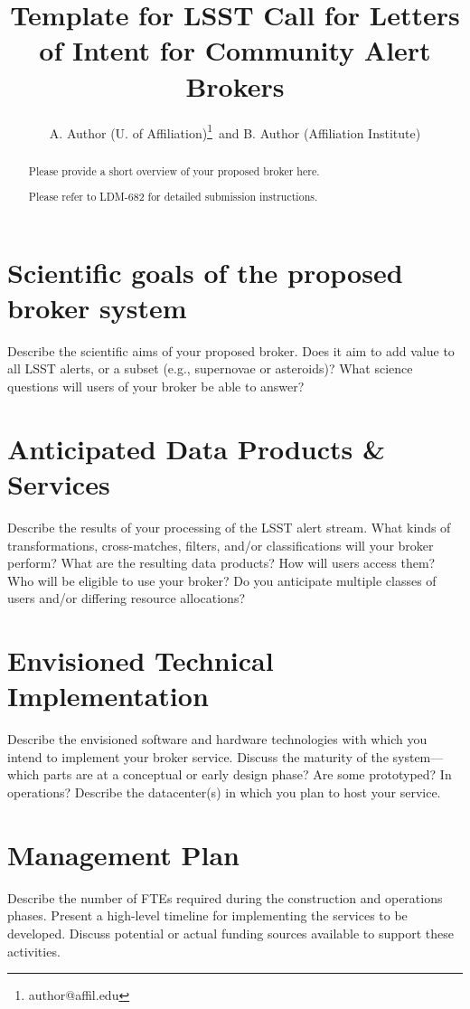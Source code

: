 \documentclass[11pt, letterpaper]{article}
\title{Template for LSST Call for Letters of Intent for Community Alert Brokers}
\author{A. Author (U. of Affiliation)\footnote{author@affil.edu}\ and B. Author (Affiliation Institute)}
\date{}
\begin{document}
\maketitle

\begin{abstract}
Please provide a short overview of your proposed broker here.

Please refer to LDM-682 for detailed submission instructions.
\end{abstract}


\section{Scientific goals of the proposed broker system}

Describe the scientific aims of your proposed broker. 
Does it aim to add value to all LSST alerts, or a subset (e.g., supernovae or asteroids)?
What science questions will users of your broker be able to answer?

\section{Anticipated Data Products \& Services}

Describe the results of your processing of the LSST alert stream. 
What kinds of transformations, cross-matches, filters, and/or classifications will your broker perform?
What are the resulting data products?
How will users access them?
Who will be eligible to use your broker?
Do you anticipate multiple classes of users and/or differing resource allocations?


\section{Envisioned Technical Implementation}

Describe the envisioned software and hardware technologies with which you intend to implement your broker service.
Discuss the maturity of the system---which parts are at a conceptual or early design phase?  Are some prototyped?  In operations?
Describe the datacenter(s) in which you plan to host your service.
	
\section{Management Plan}

Describe the number of FTEs required during the construction and operations phases.
Present a high-level timeline for implementing the services to be developed.
Discuss potential or actual funding sources available to support these activities.
\end{document}
